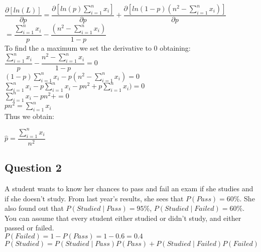 \documentclass[12pt]{article}
\newcommand\tab[1][1cm]{\hspace*{#1}}
\begin{document}
$\dfrac{\partial[ln(L) ]}{\partial p} = \dfrac{\partial[ ln(p) \sum^{n}_{i = 1} x_i  ]}{\partial p} + \dfrac{\partial[ ln( 1-p) (n^2 - \sum^{n}_{i = 1} x_i)]}{\partial p} $ \\ 

$ = \dfrac{\sum^{n}_{i = 1} x_i  }{p} - \dfrac{ (n^2 - \sum^{n}_{i = 1} x_i) }{1 - p} $ \\

To find the a maximum we set the derivative to 0 obtaining: \\

$  \dfrac{\sum^{n}_{i = 1} x_i  }{p} - \dfrac{ n^2 - \sum^{n}_{i = 1} x_i }{1 - p} = 0 $ \\

$ (1-p)\sum^{n}_{i = 1} x_i - p (n^2 - \sum^{n}_{i = 1} x_i) = 0 $ \\

$ \sum^{n}_{i = 1} x_i  - p\sum^{n}_{i = 1} x_i - pn^2 + p \sum^{n}_{i = 1} x_i) = 0 $ \\

$ \sum^{n}_{i = 1} x_i  - pn^2 + = 0 $ \\

$ pn^2 = \sum^{n}_{i = 1} x_i  $ \\

Thus we obtain: 

\begin{center}
$ \hat{p} = \dfrac{\sum^{n}_{i = 1} x_i}{n^2} $
\end{center}



\newpage
\begin{center}
\section*{Question 2}
\end{center}

\tab A student wants to know her chances to pass and fail an exam if she studies and if she doesn't study.  From last year's results, she sees that $P(Pass) = 60\%$. 
She also found out that 
$P(Studied \mid Pass) = 95\%$, 
$P(Studied \mid Failed) = 60\%$. 
You can assume that every student either studied or didn't study, and either passed or failed.\\

$P(Failed) = 1 -  P(Pass) = 1 - 0.6 = 0.4 $ \\

$P(Studied) = P(Studied \mid Pass) P(Pass) +  P(Studied \mid Failed) P(Failed)$
\end{document}
